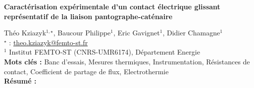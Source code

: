 


    \newpage


%
\begin{flushleft}
\addtocounter{section}{1}
{\Large \textbf{Caractérisation expérimentale d'un contact électrique glissant représentatif de la liaison pantographe-caténaire}}\label{ref:30}
\end{flushleft}
%
Théo Kziazyk$^{1,\star}$, Baucour Philippe$^{1}$, Eric Gavignet$^{1}$, Didier Chamagne$^{1}$\\[2mm]
$^{\star}$ \Letter : \url{theo.kziazyk@femto-st.fr}\\[2mm]
{\footnotesize $^{1}$ Institut FEMTO-ST (CNRS-UMR6174), Département Energie}\\
[4mm]
%
\noindent \textbf{Mots clés : } Banc d'essais, Mesures thermiques, Instrumentation, Résistances de contact, Coefficient de partage de flux, Electrothermie\\[4mm]
%
\noindent \textbf{Résumé : } 

